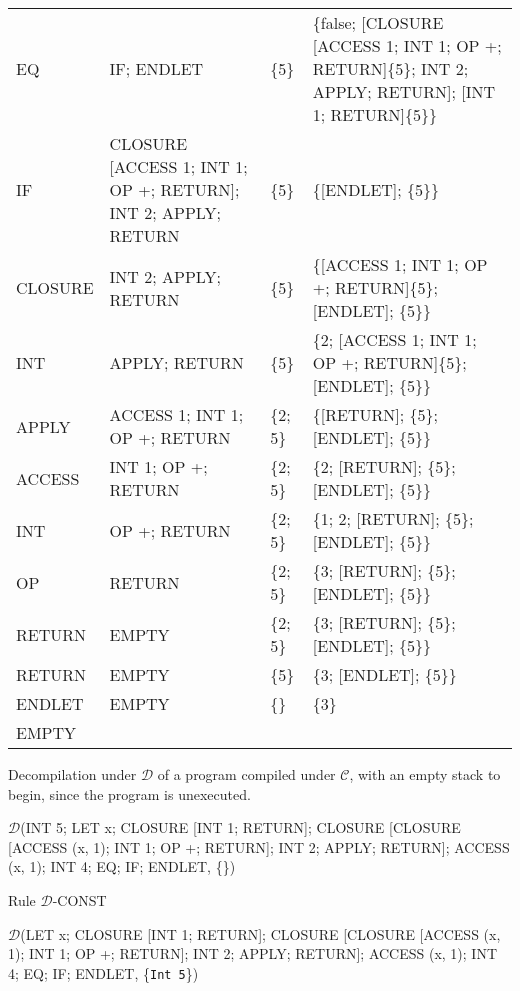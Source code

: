 \documentclass[11pt]{article}
\begin{document}
\begin{landscape}
{\begin{tabular}{l||p{9.5cm}|l|p{9.5cm}}
EQ & IF; ENDLET & \{5\}   & \{false; [CLOSURE [ACCESS 1; INT 1; OP +; RETURN]\{5\}; INT 2; APPLY; RETURN]; [INT 1; RETURN]\{5\}\}\\

IF & CLOSURE [ACCESS 1; INT 1; OP +; RETURN]; INT 2; APPLY; RETURN & \{5\} & \{[ENDLET]; \{5\}\}\\

CLOSURE & INT 2; APPLY; RETURN & \{5\} & \{[ACCESS 1; INT 1; OP +; RETURN]\{5\}; [ENDLET]; \{5\}\}\\

INT & APPLY; RETURN & \{5\} & \{2; [ACCESS 1; INT 1; OP +; RETURN]\{5\}; [ENDLET]; \{5\}\}\\

APPLY & ACCESS 1; INT 1; OP +; RETURN & \{2; 5\} & \{[RETURN]; \{5\}; [ENDLET]; \{5\}\}\\

ACCESS & INT 1; OP +; RETURN & \{2; 5\} & \{2; [RETURN]; \{5\}; [ENDLET]; \{5\}\}\\

INT & OP +; RETURN & \{2; 5\} & \{1; 2; [RETURN]; \{5\}; [ENDLET]; \{5\}\}\\

OP & RETURN & \{2; 5\} & \{3; [RETURN]; \{5\}; [ENDLET]; \{5\}\}\\

RETURN & EMPTY & \{2; 5\} & \{3; [RETURN]; \{5\}; [ENDLET]; \{5\}\}\\

RETURN & EMPTY & \{5\} & \{3; [ENDLET]; \{5\}\}\\

ENDLET & EMPTY & \{\} & \{3\}\\
EMPTY
\end{tabular}
}

\newpage

{\small

\noindent Decompilation under $\mathcal{D}$ of a program compiled under $\mathcal{C}$, with an empty stack to begin, since the program is unexecuted.

\bigskip

\noindent $\mathcal{D}$(INT 5; LET x; CLOSURE [INT 1; RETURN]; CLOSURE [CLOSURE [ACCESS (x, 1); INT 1; OP +; RETURN]; INT 2; APPLY; RETURN]; ACCESS (x, 1); INT 4; EQ; IF; ENDLET, \{\})

\smallskip
\noindent Rule $\mathcal{D}$-CONST
\smallskip

\noindent $\mathcal{D}$(LET x; CLOSURE [INT 1; RETURN]; CLOSURE [CLOSURE [ACCESS (x, 1); INT 1; OP +; RETURN]; INT 2; APPLY; RETURN]; ACCESS (x, 1); INT 4; EQ; IF; ENDLET, \{\texttt{Int 5}\})

}
\end{landscape}
\end{document}
